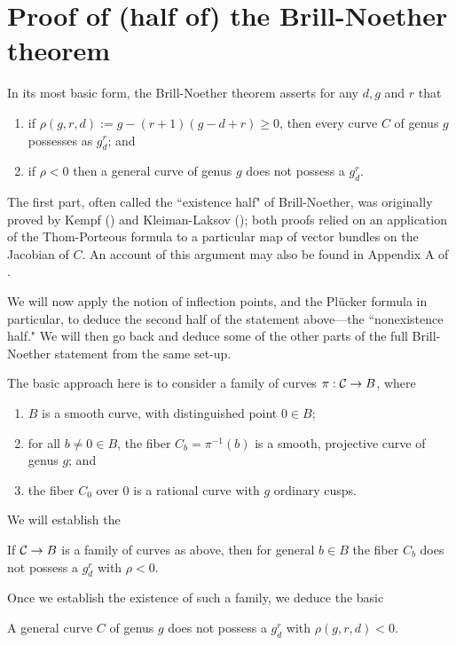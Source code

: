 \section{Proof of (half of) the Brill-Noether theorem}

In its most basic form, the Brill-Noether theorem asserts for any $d, g$ and $r$ that
\begin{enumerate}
\item if $\rho(g,r,d) := g - (r+1)(g-d+r) \geq 0$, then every curve $C$ of genus $g$ possesses as $g^r_d$; and
\item if $\rho < 0$ then a general curve of genus $g$ does not possess a $g^r_d$.
\end{enumerate}

The first part, often called the ``existence half" of Brill-Noether, was originally proved by Kempf (\cite{}) and Kleiman-Laksov (\cite{}); both proofs relied on an application of the Thom-Porteous formula to a particular map of vector bundles on the Jacobian of $C$. An account of this argument may also be found in Appendix A of \cite{}. 

We will now apply the notion of inflection points, and the Pl\"ucker formula in particular, to deduce the second half of the statement above---the ``nonexistence half." We will then go back and deduce some of the other parts of the full Brill-Noether statement from the same set-up.

The basic approach here is to consider a family of curves $\pi : \cC \to B$, where
\begin{enumerate}
\item $B$ is a smooth curve, with distinguished point $0 \in B$;
\item for all $b \neq 0 \in B$, the fiber $C_b = \pi^{-1}(b)$ is a smooth, projective curve of genus $g$;  and
\item the fiber $C_0$ over $0$ is a rational curve with $g$ ordinary cusps.
\end{enumerate}

We will establish the

\begin{lemma}\label{BN in family}
If $\cC \to B$ is a family of curves as above, then for general $b \in B$ the fiber $C_b$ does not possess a $g^r_d$ with $\rho < 0$.
\end{lemma}

Once we establish the existence of such a family, we deduce the basic

\begin{theorem}\label{bare-bones BN}
A general curve $C$ of genus $g$ does not possess a $g^r_d$ with $\rho(g,r,d) < 0$.
\end{theorem}


